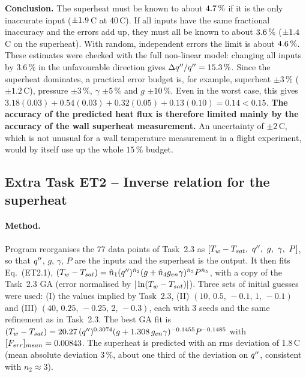 \textbf{Conclusion.} The superheat must be known to about $4.7\,\%$ if it is the only
inaccurate input ($\pm1.9$\,\textdegree C at 40\,\textdegree C). If all inputs have the same fractional inaccuracy
and the errors add up, they must all be known to about $3.6\,\%$ ($\pm1.4$\,\textdegree C on the
superheat). With random, independent errors the limit is about $4.6\,\%$. These estimates were
checked with the full non-linear model: changing all inputs by $3.6\,\%$ in the unfavourable direction
gives $\Delta q''/q''=15.3\,\%$. Since the superheat dominates, a practical error budget is, for
example, superheat $\pm3\,\%$ ($\pm1.2$\,\textdegree C), pressure $\pm3\,\%$, $\gamma$ $\pm5\,\%$ and $g$ $\pm10\,\%$.
Even in the worst case, this gives $3.18(0.03)+0.54(0.03)+0.32(0.05)+0.13(0.10)=0.14<0.15$.
\textbf{The accuracy of the predicted heat flux is therefore limited mainly by the accuracy of the wall
superheat measurement.} An uncertainty of $\pm2$\,\textdegree C, which is not unusual for a wall temperature
measurement in a flight experiment, would by itself use up the whole $15\,\%$ budget.

\subsection{Extra Task ET2 -- Inverse relation for the superheat}
\label{sec:et2}

\paragraph{Method.}
Program  reorganises the 77 data points of Task~2.3 as
$[T_w-T_{sat},\ q'',\ g,\ \gamma,\ P]$, so that $q''$, $g$, $\gamma$, $P$ are the inputs and the
superheat is the output. It then fits Eq.~(ET2.1),
$(T_w-T_{sat})=\hat{n}_{1}(q'')^{\hat{n}_{2}}(g+\hat{n}_{4}g_{en}\gamma)^{\hat{n}_{3}}P^{\hat{n}_{5}}$, with a copy of the Task~2.3 GA (error
normalised by $|\ln(T_w-T_{sat})|$). Three sets of initial guesses were used: (I) the values implied by Task~2.3,
(II) $(10,\,0.5,\,-0.1,\,1,\,-0.1)$ and (III) $(40,\,0.25,\,-0.25,\,2,\,-0.3)$, each with 3 seeds and the
same refinement as in Task~2.3. The best GA fit is
$(T_w-T_{sat})=20.27\,(q'')^{0.3074}(g+1.308\,g_{en}\gamma)^{-0.1455}P^{-0.1485}$ with $[F_{err}]_{mean}=0.00843$.
The superheat is predicted with an rms deviation of 1.8\,\textdegree C (mean absolute deviation $3\,\%$, about one
third of the deviation on $q''$, consistent with $n_2\approx3$).

